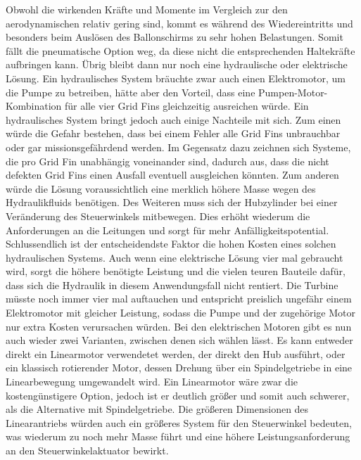 Obwohl die wirkenden Kräfte und Momente im Vergleich zur den aerodynamischen relativ gering sind, kommt es während des Wiedereintritts und besonders beim Auslösen des Ballonschirms zu sehr hohen Belastungen. Somit fällt die pneumatische Option weg, da diese nicht die entsprechenden Haltekräfte aufbringen kann. Übrig bleibt dann nur noch eine hydraulische oder elektrische Lösung. Ein hydraulisches System bräuchte zwar auch einen Elektromotor, um die Pumpe zu betreiben, hätte aber den Vorteil, dass eine Pumpen-Motor-Kombination für alle vier Grid Fins gleichzeitig ausreichen würde. Ein hydraulisches System bringt jedoch auch einige Nachteile mit sich. Zum einen würde die Gefahr bestehen, dass bei einem Fehler alle Grid Fins unbrauchbar oder gar missionsgefährdend werden. Im Gegensatz dazu zeichnen sich Systeme, die pro Grid Fin unabhängig voneinander sind, dadurch aus, dass die nicht defekten Grid Fins einen Ausfall eventuell ausgleichen könnten. Zum anderen würde die Lösung voraussichtlich eine merklich höhere Masse wegen des Hydraulikfluids benötigen. Des Weiteren muss sich der Hubzylinder bei einer Veränderung des Steuerwinkels mitbewegen. Dies erhöht wiederum die Anforderungen an die Leitungen und sorgt für mehr Anfälligkeitspotential. Schlussendlich ist der entscheidendste Faktor die hohen Kosten eines solchen hydraulischen Systems. Auch wenn eine elektrische Lösung vier mal gebraucht wird, sorgt die höhere benötigte Leistung und die vielen teuren Bauteile dafür, dass sich die Hydraulik in diesem Anwendungsfall nicht rentiert. Die Turbine müsste noch immer vier mal auftauchen und entspricht preislich ungefähr einem Elektromotor mit gleicher Leistung, sodass die Pumpe und der zugehörige Motor nur extra Kosten verursachen würden. Bei den elektrischen Motoren gibt es nun auch wieder zwei Varianten, zwischen denen sich wählen lässt. Es kann entweder direkt ein Linearmotor verwendetet werden, der direkt den Hub ausführt, oder ein klassisch rotierender Motor, dessen Drehung über ein Spindelgetriebe in eine Linearbewegung umgewandelt wird. Ein Linearmotor wäre zwar die kostengünstigere Option, jedoch ist er deutlich größer und somit auch schwerer, als die Alternative mit Spindelgetriebe. Die größeren Dimensionen des Linearantriebs würden auch ein größeres System für den Steuerwinkel bedeuten, was wiederum zu noch mehr Masse führt und eine höhere Leistungsanforderung an den Steuerwinkelaktuator bewirkt.
\\~\\
